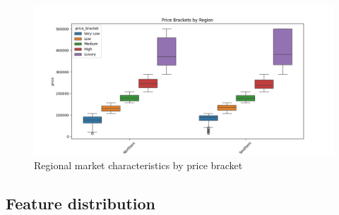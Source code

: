 \documentclass[a4paper, 11pt]{article}
\begin{document}
\begin{figure}[h]
    \centering
    \includegraphics[width=\linewidth]{figs/regional_markets.png}
    \caption{Regional market characteristics by price bracket}
    \label{fig:regional_markets}
\end{figure}

\subsection{Feature distribution}
\end{document}
